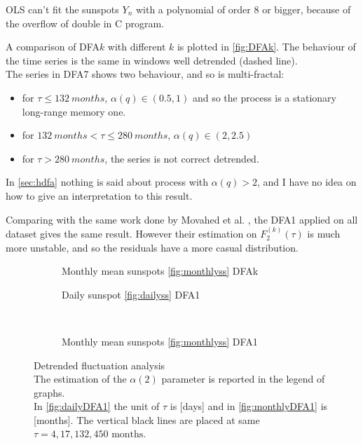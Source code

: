 OLS can't fit the sunspots $Y_n$ with a polynomial of order 8 or bigger, because of the overflow of double in C program.

A comparison of DFA$k$ with different $k$ is plotted in \autoref{fig:DFAk}. 
The behaviour of the time series is the same in windows well detrended (dashed line).\\ 
The series in DFA7 shows two behaviour, and so is multi-fractal:
\begin{itemize}
	\item for $\tau \le \SI{132}{months}$, $\alpha(q) \in (0.5, 1)$ and so the process is a stationary long-range memory one.
	\item for $\SI{132}{months} < \tau \le \SI{280}{months}$, $\alpha(q) \in (2, 2.5)$ 
	\item for $\tau > \SI{280}{months}$, the series is not correct detrended.
\end{itemize}

In \autoref{sec:hdfa} nothing is said about process with $\alpha(q)>2$, and I have no idea on how to give an interpretation to this result. 

Comparing with the same work done by Movahed et al. \cite{Movahed_2006}, the DFA1 applied on all dataset gives the same result. However their estimation on $F_2^{( k )}(\tau)$ is much more unstable, and so the residuals have a more casual distribution.

\begin{figure}[!h]
	\centering
	\begin{subfigure}{\textwidth}
		
		\caption{Monthly mean sunspots \ref{fig:monthlyss} DFAk}\label{fig:DFAk}
	\end{subfigure}

	\begin{subfigure}{0.48\textwidth}
		
		\caption{Daily sunspot \ref{fig:dailyss} DFA1}\label{fig:dailyDFA1}
	\end{subfigure}
	~
	\begin{subfigure}{0.48\textwidth}
		
		\caption{Monthly mean sunspots \ref{fig:monthlyss} DFA1}\label{fig:monthlyDFA1}
	\end{subfigure}
	\caption{Detrended fluctuation analysis\\
	The estimation of the $\alpha(2)$ parameter is reported in the legend of graphs.\\
	In \autoref{fig:dailyDFA1} the unit of $\tau$ is [days] and in \autoref{fig:monthlyDFA1} is [months]. The vertical black lines are placed at same $\tau = 4,17, 132, 450 \text{ months}$.}\label{fig:DFA}
\end{figure}

